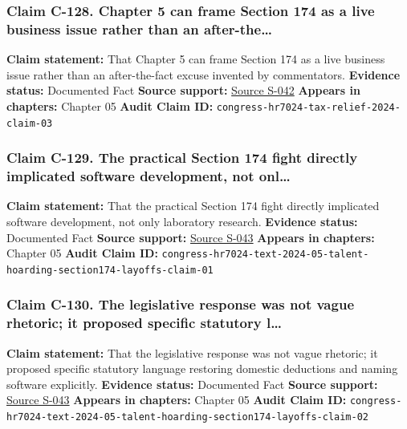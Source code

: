 \documentclass[
  american,
  11pt,
  letterpaper,
]{article}
\begin{document}
\subsubsection{Claim C-128. Chapter 5 can frame Section 174 as a live
business issue rather than an
after-the\ldots{}}\label{claim-c-128-chapter-5-can-frame-section-174-as-a-live-business-issue-rather-than-an-after-the}

\textbf{Claim statement:} That Chapter 5 can frame Section 174 as a live
business issue rather than an after-the-fact excuse invented by
commentators. \textbf{Evidence status:} Documented Fact \textbf{Source
support:}
\hyperref[source-s-042-h-r-7024-tax-relief-for-american-families-and-workers-act-of-2024]{Source
S-042} \textbf{Appears in chapters:} Chapter 05 \textbf{Audit Claim ID:}
\texttt{congress-hr7024-tax-relief-2024-claim-03}

\subsubsection{Claim C-129. The practical Section 174 fight directly
implicated software development, not
onl\ldots{}}\label{claim-c-129-the-practical-section-174-fight-directly-implicated-software-development-not-onl}

\textbf{Claim statement:} That the practical Section 174 fight directly
implicated software development, not only laboratory research.
\textbf{Evidence status:} Documented Fact \textbf{Source support:}
\hyperref[source-s-043-h-r-7024-text-deduction-for-domestic-research-and-experimental-expenditures]{Source
S-043} \textbf{Appears in chapters:} Chapter 05 \textbf{Audit Claim ID:}
\texttt{congress-hr7024-text-2024-05-talent-hoarding-section174-layoffs-claim-01}

\subsubsection{Claim C-130. The legislative response was not vague
rhetoric; it proposed specific statutory
l\ldots{}}\label{claim-c-130-the-legislative-response-was-not-vague-rhetoric-it-proposed-specific-statutory-l}

\textbf{Claim statement:} That the legislative response was not vague
rhetoric; it proposed specific statutory language restoring domestic
deductions and naming software explicitly. \textbf{Evidence status:}
Documented Fact \textbf{Source support:}
\hyperref[source-s-043-h-r-7024-text-deduction-for-domestic-research-and-experimental-expenditures]{Source
S-043} \textbf{Appears in chapters:} Chapter 05 \textbf{Audit Claim ID:}
\texttt{congress-hr7024-text-2024-05-talent-hoarding-section174-layoffs-claim-02}
\end{document}
